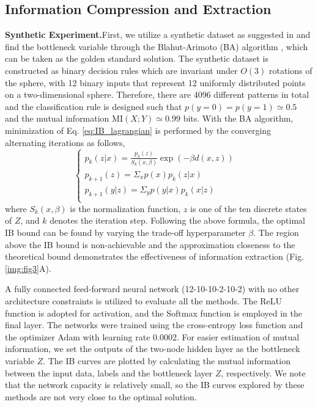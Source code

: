 \documentclass[10pt,journal,compsoc]{IEEEtran}
\begin{document}
\subsection{Information Compression and Extraction}
\noindent \textbf{Synthetic Experiment.}\quad First, we utilize a synthetic dataset as suggested in \cite{ShwartzZiv2017OpeningTB} and find the bottleneck variable through the Blahut-Arimoto (BA) algorithm \cite{Tishby2000TheIB}, which can be taken as the golden standard solution. The synthetic dataset is constructed as binary decision rules which are invariant under $O(3)$ rotations of the sphere, with 12 binary inputs that represent 12 uniformly distributed points on a two-dimensional sphere. Therefore, there are 4096 different patterns in total and the classification rule is designed such that $p(y=0)=p(y=1)\simeq 0.5$ and the mutual information $\mathrm{MI}(X; Y) \simeq 0.99$ bits. With the BA algorithm, minimization of Eq. \ref{eq:IB_lagrangian} is performed by the converging alternating iterations as follows, \\
\begin{equation}
\left\{
\begin{array}{lr}
p_{k}(z|x) = \frac{p_{k}(z)}{S_{k}(x,\beta)}\exp(-\beta d(x,z))  &\\
p_{k+1}(z) = \Sigma_{x}p(x)p_{k}(z|x)  &\\
p_{k+1}(y|z) = \Sigma_{y}p(y|x)p_{k}(x|z) &\\
\end{array}
\right.
\end{equation}
where $S_{k}(x,\beta)$ is the normalization function, $z$ is one of the ten discrete states of $Z$, and $k$ denotes the iteration step. Following the above formula, the optimal IB bound can be found by varying the trade-off hyperparameter $\beta$. The region above the IB bound is non-achievable and the approximation closeness to the theoretical bound demonstrates the effectiveness of information extraction (Fig. \ref{img:fig3}A).

A fully connected feed-forward neural network (12-10-10-2-10-2) with no other architecture constraints is utilized to evaluate all the methods. The ReLU function is adopted for activation, and the Softmax function is employed in the final layer. The networks were trained using the cross-entropy loss function and the optimizer Adam with learning rate 0.0002. For easier estimation of mutual information, we set the outputs of the two-node hidden layer as the bottleneck variable $Z$. The IB curves are plotted by calculating the mutual information between the input data, labels and the bottleneck layer $Z$, respectively. We note that the network capacity is relatively small, so the IB curves explored by these methods are not very close to the optimal solution.
\end{document}
